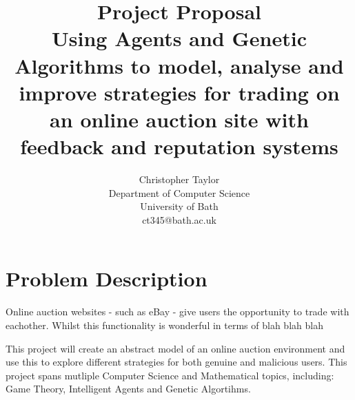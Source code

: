 \documentclass{article}
\title{Project Proposal \\ Using Agents and Genetic Algorithms to model, analyse and improve strategies for trading on an online auction site with feedback and reputation systems}
\author{Christopher Taylor \\ Department of Computer Science \\ University of Bath \\ ct345@bath.ac.uk}
\begin{document}
\maketitle
{}
\listoftodos
\section{Problem Description}
\label{sec:problem-description}
Online auction websites - such as eBay - give users the opportunity to trade with eachother. Whilst this functionality is wonderful in terms of blah blah blah 

This project will create an abstract model of an online auction environment and use this to explore different strategies for both genuine and malicious users. This project spans mutliple Computer Science and Mathematical topics, including: Game Theory, Intelligent Agents and Genetic Algortihms.
\end{document}
